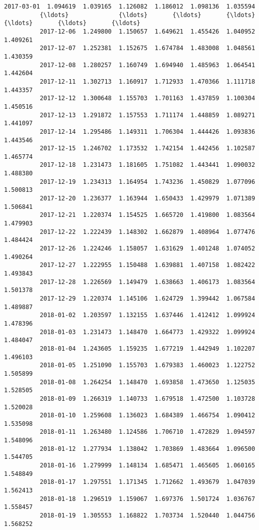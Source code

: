 \documentclass[11pt]{article}
\begin{document}
\begin{Verbatim}[commandchars=\\\{\}]
          2017-03-01  1.094619  1.039165  1.126082  1.186012  1.098136  1.035594   
          {\ldots}              {\ldots}       {\ldots}       {\ldots}       {\ldots}       {\ldots}       {\ldots}   
          2017-12-06  1.249800  1.150657  1.649621  1.455426  1.040952  1.409261   
          2017-12-07  1.252381  1.152675  1.674784  1.483008  1.048561  1.430359   
          2017-12-08  1.280257  1.160749  1.694940  1.485963  1.064541  1.442604   
          2017-12-11  1.302713  1.160917  1.712933  1.470366  1.111718  1.443357   
          2017-12-12  1.300648  1.155703  1.701163  1.437859  1.100304  1.450516   
          2017-12-13  1.291872  1.157553  1.711174  1.448859  1.089271  1.441097   
          2017-12-14  1.295486  1.149311  1.706304  1.444426  1.093836  1.443546   
          2017-12-15  1.246702  1.173532  1.742154  1.442456  1.102587  1.465774   
          2017-12-18  1.231473  1.181605  1.751082  1.443441  1.090032  1.488380   
          2017-12-19  1.234313  1.164954  1.743236  1.450829  1.077096  1.500813   
          2017-12-20  1.236377  1.163944  1.650433  1.429979  1.071389  1.506841   
          2017-12-21  1.220374  1.154525  1.665720  1.419800  1.083564  1.479903   
          2017-12-22  1.222439  1.148302  1.662879  1.408964  1.077476  1.484424   
          2017-12-26  1.224246  1.158057  1.631629  1.401248  1.074052  1.490264   
          2017-12-27  1.222955  1.150488  1.639881  1.407158  1.082422  1.493843   
          2017-12-28  1.226569  1.149479  1.638663  1.406173  1.083564  1.501378   
          2017-12-29  1.220374  1.145106  1.624729  1.399442  1.067584  1.489887   
          2018-01-02  1.203597  1.132155  1.637446  1.412412  1.099924  1.478396   
          2018-01-03  1.231473  1.148470  1.664773  1.429322  1.099924  1.484047   
          2018-01-04  1.243605  1.159235  1.677219  1.442949  1.102207  1.496103   
          2018-01-05  1.251090  1.155703  1.679383  1.460023  1.122752  1.505899   
          2018-01-08  1.264254  1.148470  1.693858  1.473650  1.125035  1.528505   
          2018-01-09  1.266319  1.140733  1.679518  1.472500  1.103728  1.520028   
          2018-01-10  1.259608  1.136023  1.684389  1.466754  1.090412  1.535098   
          2018-01-11  1.263480  1.124586  1.706710  1.472829  1.094597  1.548096   
          2018-01-12  1.277934  1.138042  1.703869  1.483664  1.096500  1.544705   
          2018-01-16  1.279999  1.148134  1.685471  1.465605  1.060165  1.548849   
          2018-01-17  1.297551  1.171345  1.712662  1.493679  1.047039  1.562413   
          2018-01-18  1.296519  1.159067  1.697376  1.501724  1.036767  1.558457   
          2018-01-19  1.305553  1.168822  1.703734  1.520440  1.044756  1.568252   
          

\end{Verbatim}
\end{document}
